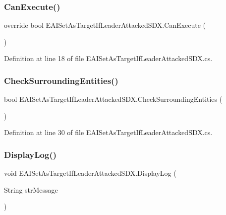 \subsubsection{\texorpdfstring{CanExecute()}{CanExecute()}}
{\footnotesize\ttfamily override bool E\+A\+I\+Set\+As\+Target\+If\+Leader\+Attacked\+S\+D\+X.\+Can\+Execute (\begin{DoxyParamCaption}{ }\end{DoxyParamCaption})}



Definition at line 18 of file E\+A\+I\+Set\+As\+Target\+If\+Leader\+Attacked\+S\+D\+X.\+cs.

\mbox{\label{class_e_a_i_set_as_target_if_leader_attacked_s_d_x_a69887bc9691491549b640e9aa4bb00bd}} 
\subsubsection{\texorpdfstring{CheckSurroundingEntities()}{CheckSurroundingEntities()}}
{\footnotesize\ttfamily bool E\+A\+I\+Set\+As\+Target\+If\+Leader\+Attacked\+S\+D\+X.\+Check\+Surrounding\+Entities (\begin{DoxyParamCaption}{ }\end{DoxyParamCaption})}



Definition at line 30 of file E\+A\+I\+Set\+As\+Target\+If\+Leader\+Attacked\+S\+D\+X.\+cs.

\mbox{\label{class_e_a_i_set_as_target_if_leader_attacked_s_d_x_ac6971e678bcccd43ead16491145e3c4b}} 
\subsubsection{\texorpdfstring{DisplayLog()}{DisplayLog()}}
{\footnotesize\ttfamily void E\+A\+I\+Set\+As\+Target\+If\+Leader\+Attacked\+S\+D\+X.\+Display\+Log (\begin{DoxyParamCaption}\item[{String}]{str\+Message }\end{DoxyParamCaption})}



